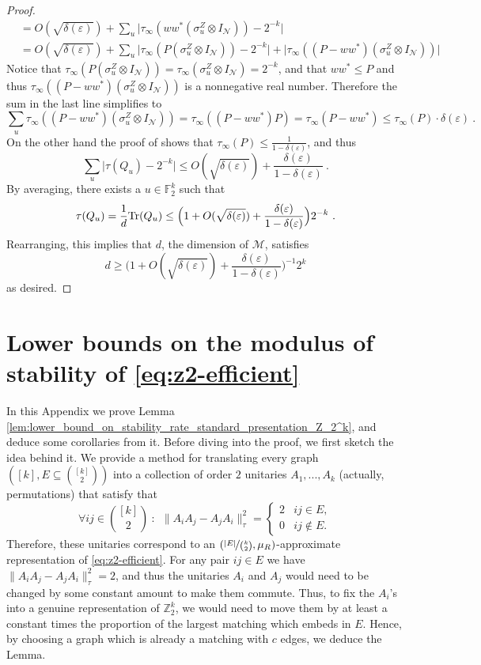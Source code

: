 \documentclass[11pt]{article}
\theoremstyle{definition}
\newcommand{\Tr}{\mbox{\rm Tr}}
\newcommand{\F}{\ensuremath{\mathbb{F}}}
\newcommand{\Z}{\ensuremath{\mathbb{Z}}}
\newcommand{\mM}{\ensuremath{\mathcal{M}}}
\newcommand{\eps}{\varepsilon}
\newcommand{\mN}{\mathcal{N}}
\begin{document}
\begin{proof}
\begin{align*}
	&= O(\sqrt{\delta(\eps)}) + \sum_u \Big | \tau_\infty (w w^* (\sigma^Z_u \otimes I_\mN)) - 2^{-k} \Big| \\
	&= O(\sqrt{\delta(\eps)}) + \sum_u \Big | \tau_\infty (P (\sigma^Z_u \otimes I_\mN)) - 2^{-k} \Big| + \Big | \tau_\infty((P - ww^*)(\sigma^Z_u \otimes I_\mN)) \Big|
\end{align*}
Notice that $\tau_\infty (P (\sigma^Z_u \otimes I_\mN)) = \tau_\infty (\sigma^Z_u \otimes I_\mN) = 2^{-k}$, and that $ww^* \leq P$ and thus $\tau_\infty((P - ww^*)(\sigma^Z_u \otimes I_\mN))$ is a nonnegative real number. Therefore the sum in the last line simplifies to
\[
\sum_u \tau_\infty((P - ww^*)(\sigma^Z_u \otimes I_\mN)) = \tau_\infty((P - ww^*) P) = \tau_\infty(P - ww^*) \leq \tau_\infty(P) \cdot \delta(\eps)~.
\]
On the other hand the proof of  shows that $\tau_\infty(P) \leq \frac{1}{1 - \delta(\eps)}$, and thus 
\[
\sum_u \Big| \tau(Q_u) - 2^{-k} \Big| \leq O(\sqrt{\delta(\eps)}) + \frac{\delta(\eps)}{1 - \delta(\eps)}~.
\]
By averaging, there exists a $u \in \F_2^k$ such that
\[
\tau(Q_u) = \frac{1}{d} \Tr(Q_u) \leq  \Big( 1 + O(\sqrt{\delta(\eps)}) + \frac{\delta(\eps)}{1 - \delta(\eps)}\Big) 2^{-k}~.
\]
Rearranging, this implies that $d$, the dimension of $\mM$, satisfies
\[
	d \geq \Big( 1 + O(\sqrt{\delta(\eps)}) + \frac{\delta(\eps)}{1 - \delta(\eps)}\Big)^{-1} 2^k
\]
as desired.
\end{proof}

\appendix
\section{Lower bounds on the modulus of stability of \eqref{eq:z2-efficient}}\label{appendix:lower_bounds}
In this Appendix we prove Lemma \ref{lem:lower_bound_on_stability_rate_standard_presentation_Z_2^k}, and deduce some corollaries from it. 
Before diving into the proof, we first sketch the idea behind it. 
We provide a method for translating every graph $([k],E\subseteq{\binom{[k]}{2}})$ into a collection of order $2$ unitaries $A_1,...,A_k$ (actually, permutations) that satisfy that
\begin{equation}\label{eq:commuting_or_not}
   \forall ij\in \binom{[k]}{2}\ \colon\ \ \|A_iA_j-A_jA_i\|_\tau^2=\begin{cases}
    2 & ij\in E,\\
    0 & ij\notin E.
\end{cases} 
\end{equation}
Therefore, these unitaries correspond to an $(\nicefrac{|E|}{\binom{k}{2}},\mu_R)$-approximate representation of \eqref{eq:z2-efficient}. For any pair $ij\in E$ we have $\|A_iA_j-A_jA_i\|_\tau^2=2$, and thus the unitaries $A_i$ and $A_j$ would need to be changed  by some constant amount to make them commute. Thus, to fix the $A_i$'s into a genuine representation of $\Z_2^k$, we would need to move them by at least a constant times the proportion of the largest   matching which embeds in $E$. Hence, by choosing a graph which is already a  matching with $c$ edges, we deduce the Lemma. 
\end{document}
